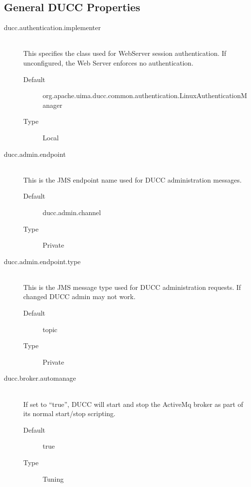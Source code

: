 \subsection{General DUCC Properties}
    \begin{description}

       \item[ducc.authentication.implementer] \hfill \\
         This specifies the class used for WebServer session authentication.  If unconfigured,
         the Web Server enforces no authentication.
         \begin{description}
           \item[Default] org.apache.uima.ducc.common.authentication.LinuxAuthenticationManager
           \item[Type] Local
         \end{description}

       \item[ducc.admin.endpoint] \hfill \\
         This is the JMS endpoint name used for DUCC administration messages. 
         \begin{description}
           \item[Default] ducc.admin.channel 
           \item[Type] Private 
         \end{description}

       \item[ducc.admin.endpoint.type] \hfill \\
         This is the JMS message type used for DUCC administration requests. If changed DUCC 
         admin may not work. 
         \begin{description}
           \item[Default] topic 
           \item[Type] Private
         \end{description} 
           
       \item[ducc.broker.automanage] \hfill \\
         If set to ``true'', DUCC will start and stop the ActiveMq broker as part of its normal start/stop
         scripting.  
         \begin{description}
           \item[Default] true
           \item[Type] Tuning
         \end{description} 


\end{description}
